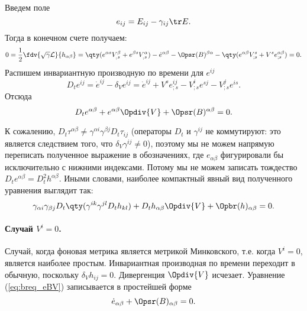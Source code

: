 \documentclass[\docroot/reports/draft/report.tex]{subfiles}
\begin{document}
    Введем поле
    \begin{equation}
        e_{ij} = E_{ij} - \gamma_{ij} \tr E .
    \end{equation}
    Тогда в конечном счете получаем:
    \begin{equation*}
        0 = \frac{1}{2}\fdv{\sqrt{\gamma}\mathcal{L}}{h_{\alpha\beta}} =
            \qty(e^{\alpha s} V^\beta_{_;s} + e^{\beta s} V^\alpha_{_;s})
                - \dot{e}^{\alpha\beta}
                - \Opsr(B)^{\beta\alpha}
                - \qty(e^{\alpha\beta} V^s_{;s} + V^s e^{\alpha\beta}_{;s}) = 0 .
    \end{equation*}
    Распишем инвариантную производную по времени для $e^{ij}$
    \begin{equation}
        D_t{e^{ij}} = \dot{e}^{ij} - \delta_V e^{ij} =
            \dot{e}^{ij} + V^s e^{ij}_{;s} - V^i_{;s} e^{sj} - V^j_{;s} e^{is} .
    \end{equation}
    Отсюда
    \begin{equation}\label{eq:breq_eBV}
        D_t{e^{\alpha\beta}} + e^{\alpha\beta} \Opdiv{V} + \Opsr(B)^{\alpha\beta} = 0 .
    \end{equation}

    К сожалению, $D_t{\tau^{\alpha\beta}} \neq \gamma^{\alpha i}\gamma^{\beta j} D_t{\tau_{ij}}$ (операторы $D_t$ и $\gamma^{ij}$ не коммутируют: это является следствием того, что $\delta_V{\gamma^{ij}} \neq 0$), поэтому мы не можем напрямую переписать полученное выражение в обозначениях, где $e_{\alpha\beta}$ фигурировали бы исключительно с нижними индексами. Потому мы не можем записать тождество $D_t{e^{\alpha\beta}} = D^2_t{h^{\alpha\beta}}$. Иными словами, наиболее компактный явный вид полученного уравнения выглядит так:
    \begin{equation}
        \gamma_{\alpha i}\gamma_{\beta j} D_t\qty(\gamma^{ik}\gamma^{jl} D_t{h_{kl}}) + D_t{h_{\alpha\beta}} \Opdiv{V} + \Opbr(h)_{\alpha\beta} = 0 .
    \end{equation}

    \paragraph{Случай $V^i = 0$.}

    Случай, когда фоновая метрика является метрикой Минковского, т.е. когда $V^i = 0$, является наиболее простым. Инвариантная производная по времени переходит в обычную, поскольку $\delta_V{h_{ij}} = 0$. Дивергенция $\Opdiv{V}$ исчезает. Уравнение (\ref{eq:breq_eBV}) записывается в простейшей форме
    \begin{equation}
        \dot{e}_{\alpha\beta} + \Opsr(B)_{\alpha\beta} = 0 .
    \end{equation}
\end{document}
